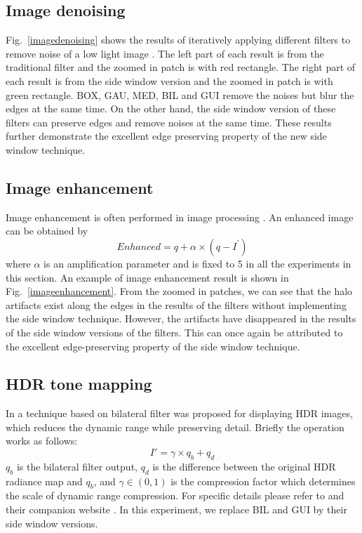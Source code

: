 \documentclass[10pt,twocolumn,letterpaper]{article}
\begin{document}
\subsection{Image denoising}
Fig.~\ref{imagedenoising} shows the results of iteratively applying different filters to remove noise of a low light image \cite{renoir}. The left part of each result is from the traditional filter and the zoomed in patch is with red rectangle. The right part of each result is from the side window version and the zoomed in patch is with green rectangle. BOX, GAU, MED, BIL and GUI remove the noises but blur the edges at the same time. On the other hand, the side window version of these filters can preserve edges and remove noises at the same time. These results further demonstrate the excellent edge preserving property of the new side window technique. \subsection{Image enhancement}
Image enhancement is often performed in image processing \cite{gf}\cite{wgf}. An enhanced image can be obtained by 
\begin{equation}
Enhanced = q + \alpha \times (q-I^{'})
\end{equation}
where $\alpha$ is an amplification parameter and is fixed to 5 in all the experiments in this section. An example of image enhancement result is shown in Fig.~\ref{imageenhancement}. From the zoomed in patches, we can see that the halo artifacts exist along the edges in the results of the filters without implementing the side window technique. However, the artifacts have disappeared in the results of the side window versions of the filters. This can once again be attributed to the excellent edge-preserving property of the side window technique. \subsection{HDR tone mapping}
In \cite{fbf} a technique based on bilateral filter was proposed for displaying HDR images, which reduces the dynamic range while preserving detail. Briefly the operation works as follows:
\begin{equation}
I' = \gamma \times q_{b} + q_{d}
\end{equation}
$q_{b}$ is the bilateral filter output, $q_d$ is the difference between the original HDR radiance map and $q_{b}$, and $\gamma\in(0,1)$ is the compression factor which determines the scale of dynamic range compression. For specific details please refer to \cite{fbf} and their companion website \cite{eh3}. In this experiment, we replace BIL and GUI by their side window versions. 
\end{document}
